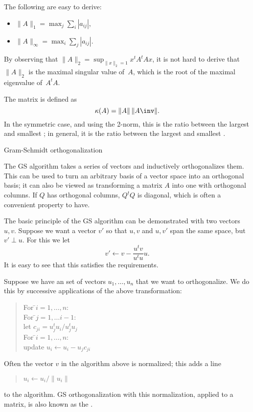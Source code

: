 The following are easy to derive:
\begin{itemize}
\item $\|A\|_1=\max_j\sum_i|a_{ij}|$,
\item $\|A\|_\infty=\max_i\sum_j|a_{ij}|$.
\end{itemize}
By observing that $\|A\|_2=\sup_{\|x\|_2=1} x^tA^tAx$, it is not hard
to derive that $\|A\|_2$ is the maximal singular value of~$A$, which
is the root of the maximal eigenvalue of~$A^tA$.

The matrix  is defined as
\[ \kappa(A)=\|A\|\,\|A\inv\|. \]
In the symmetric case, and using the 2-norm, this is the ratio between the largest and
smallest ;
in general, it is the ratio between the largest and smallest .


 {Gram-Schmidt orthogonalization}
\label{app:gram-schmidt}

The \acf{GS} algorithm takes a series of vectors and inductively
orthogonalizes them. This can be used to turn an arbitrary basis of a
vector space into an orthogonal basis; it can also be viewed as
transforming a matrix $A$ into one with orthogonal columns. If $Q$ has
orthogonal columns, $Q^tQ$ is diagonal, which is often a convenient
property to have.

The basic principle of the \ac{GS} algorithm
can be demonstrated with two
vectors~$u,v$. Suppose we want a vector $v'$ so that $u,v$ and $u,v'$
span the same space, but $v'\perp u$. For this we let
\[ v'\leftarrow v-\frac{u^tv}{u^tu}u. \]
It is easy to see that this satisfies the requirements.

Suppose we have an set of vectors
$u_1,\ldots,u_n$ that we want to orthogonalize. We do this by
successive applications of the above transformation:

\begin{quote}
  \begin{tabbing}
    For \=$i=1,\ldots,n$:\\
    \> For \=$j=1,\ldots i-1$:\\
    \>\>let $c_{ji}=u_j^tu_i/u_j^tu_j$\\
    \> For \=$i=1,\ldots,n$:\\
    \>\> update $u_i\leftarrow u_i-u_jc_{ji}$
  \end{tabbing}
\end{quote}

Often the vector $v$ in the algorithm above is normalized; this adds a line
\begin{quote}
  \begin{tabbing}
    $u_i\leftarrow u_i/\|u_i\|$
  \end{tabbing}
\end{quote}
to the algorithm.
\ac{GS} orthogonalization with this normalization, applied to a
matrix, is also known as the .

